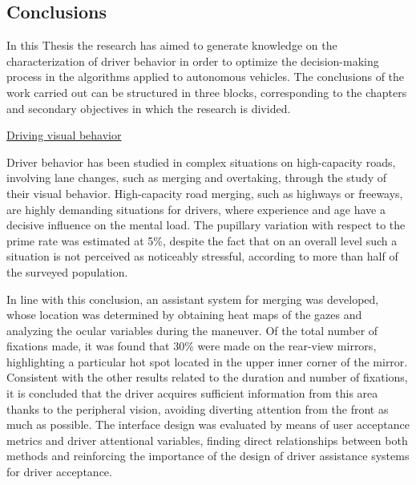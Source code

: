 \subsection*{Conclusions}
In this Thesis the research has aimed to generate knowledge on the characterization of driver behavior in order to optimize the decision-making process in the algorithms applied to autonomous vehicles. The conclusions of the work carried out can be structured in three blocks, corresponding to the chapters and secondary objectives in which the research is divided. 

\underline{Driving visual behavior }

Driver behavior has been studied in complex situations on high-capacity roads, involving lane changes, such as merging and overtaking, through the study of their visual behavior. High-capacity road merging, such as highways or freeways, are highly demanding situations for drivers, where experience and age have a decisive influence on the mental load. The pupillary variation with respect to the prime rate was estimated at 5\%, despite the fact that on an overall level such a situation is not perceived as noticeably stressful, according to more than half of the surveyed population.  

In line with this conclusion, an assistant system for merging was developed, whose location was determined by obtaining heat maps of the gazes and analyzing the ocular variables during the maneuver. Of the total number of fixations made, it was found that 30\% were made on the rear-view mirrors, highlighting a particular hot spot located in the upper inner corner of the mirror. Consistent with the other results related to the duration and number of fixations, it is concluded that the driver acquires sufficient information from this area thanks to the peripheral vision, avoiding diverting attention from the front as much as possible. The interface design was evaluated by means of user acceptance metrics and driver attentional variables, finding direct relationships between both methods and reinforcing the importance of the design of driver assistance systems for driver acceptance.  

